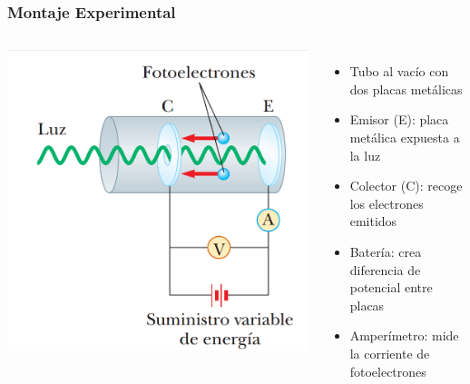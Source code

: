 \documentclass{beamer}
\begin{document}
	\begin{frame}
		\frametitle{Montaje Experimental}
		\begin{columns}
			\includegraphics[width=\textwidth]{../Imagenes/EFE_diagrama}
			\begin{itemize}
				\item Tubo al vacío con dos placas metálicas
				\item Emisor (E): placa metálica expuesta a la luz
				\item Colector (C): recoge los electrones emitidos
				\item Batería: crea diferencia de potencial entre placas
				\item Amperímetro: mide la corriente de fotoelectrones
			\end{itemize}
		\end{columns}
	\end{frame}
	
\end{document}
